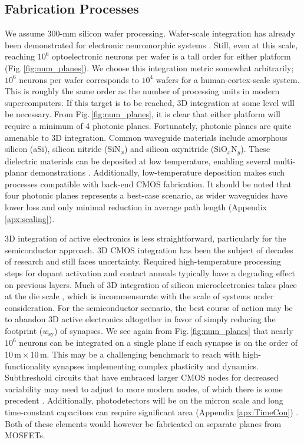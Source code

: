 \documentclass[twocolumn]{article}
\begin{document}
\subsection{Fabrication Processes}
\label{sec:fabrication}
We assume 300-mm silicon wafer processing. Wafer-scale integration has already been demonstrated for electronic neuromorphic systems \cite{schemmel2010wafer}. Still, even at this scale, reaching $10^6$ optoelectronic neurons per wafer is a tall order for either platform (Fig.\,\ref{fig:num_planes}). We choose this integration metric somewhat arbitrarily; $10^6$ neurons per wafer corresponds to $10^4$ wafers for a human-cortex-scale system. This is roughly the same order as the number of processing units in modern supercomputers. If this target is to be reached, 3D integration at some level will be necessary. From Fig.\,\ref{fig:num_planes}, it is clear that either platform will require a minimum of 4 photonic planes. Fortunately, photonic planes are quite amenable to 3D integration. Common waveguide materials include amorphous silicon (aSi), silicon nitride (SiN$_x$) and silicon oxynitride (SiO$_x$N$_y$). These dielectric materials can be deposited at low temperature, enabling several multi-planar demonstrations \cite{shpa2015,sahu2015,chbu2017,zhli2018}. Additionally, low-temperature deposition makes such processes compatible with back-end CMOS fabrication. It should be noted that four photonic planes represents a best-case scenario, as wider waveguides have lower loss and only minimal reduction in average path length (Appendix \ref{apx:scaling}).

3D integration of active electronics is less straightforward, particularly for the semiconductor approach. 3D CMOS integration has been the subject of decades of research \cite{ro1983,knan2008,saan2008,viba2011,zhxi2015,li2013,elfe2016,lish2017} and still faces uncertainty. Required high-temperature processing steps for dopant activation and contact anneals typically have a degrading effect on previous layers. Much of 3D integration of silicon microelectronics takes place at the die scale \cite{elfe2016}, which is incommensurate with the scale of systems under consideration. For the semiconductor scenario, the best course of action may be to abandon 3D active electronics altogether in favor of simply reducing the footprint ($w_{\mathrm{sy}}$) of synapses. We see again from Fig.\,\ref{fig:num_planes} that nearly $10^6$ neurons can be integrated on a single plane if each synapse is on the order of 10\,\textmu m\,$\times$\,10\,\textmu m. This may be a challenging benchmark to reach with high-functionality synapses implementing complex plasticity and dynamics. Subthreshold circuits that have embraced larger CMOS nodes for decreased variability may need to adjust to more modern nodes, of which there is some precedent \cite{rupa2019}. Additionally, photodetectors will be on the micron scale and long time-constant capacitors can require significant area (Appendix \ref{apx:TimeCon}) \cite{indiveri2019importance}. Both of these elements would however be fabricated on separate planes from MOSFETs.
\end{document}
